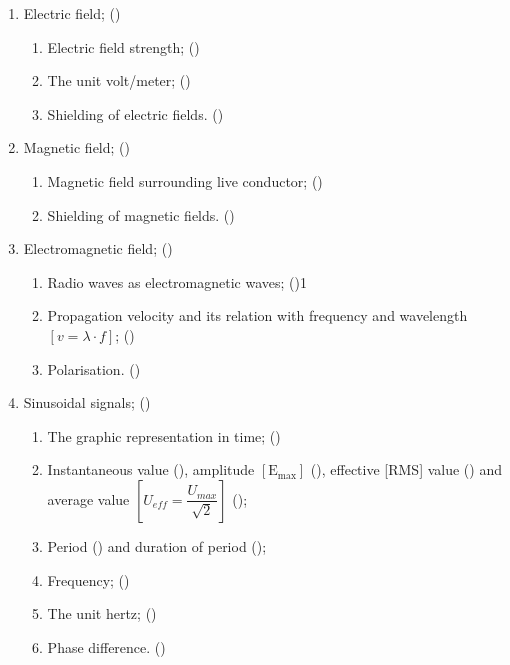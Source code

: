 \begin{flushleft}
\begin{enumerate}
\begin{enumerate}
\item Electric field; ()\label{HAREC.a.1.3}
\begin{enumerate}
\item Electric field strength; ()\label{HAREC.a.1.3.1}
\item The unit volt/meter; ()\label{HAREC.a.1.3.2}
\item Shielding of electric fields. ()\label{HAREC.a.1.3.3}
\end{enumerate}

\item Magnetic field; ()\label{HAREC.a.1.4}
\begin{enumerate}
\item Magnetic field surrounding live conductor; ()\label{HAREC.a.1.4.1}
\item Shielding of magnetic fields. ()\label{HAREC.a.1.4.2}
\end{enumerate}

\item Electromagnetic field; ()\label{HAREC.a.1.5}
\begin{enumerate}
\item Radio waves as electromagnetic waves; ()\label{HAREC.a.1.5.1}1
\item Propagation velocity and its relation with frequency and wavelength
  \(\left[v = \lambda \cdot f\right]\);
  ()\label{HAREC.a.1.5.2}
\item Polarisation. ()\label{HAREC.a.1.5.3}
\end{enumerate}

\item Sinusoidal signals; ()\label{HAREC.a.1.6}
\begin{enumerate}
\item The graphic representation in time;
  ()\label{HAREC.a.1.6.1}
\item Instantaneous value ()\label{HAREC.a.1.6.2a},
  amplitude \(\mathrm{[E_{max}]}\)
  ()\label{HAREC.a.1.6.2b},
  effective [RMS] value ()\label{HAREC.a.1.6.2c}
  and average value \(\left[U_{eff} = \dfrac{U_{max}}{\sqrt{2}}\right]\)
  ()\label{HAREC.a.1.6.2d};
\item Period ()\label{HAREC.a.1.6.3a}
  and duration of period ()\label{HAREC.a.1.6.3b};
\item Frequency; ()\label{HAREC.a.1.6.4}
\item The unit hertz; ()\label{HAREC.a.1.6.5}
\item Phase difference. ()\label{HAREC.a.1.6.6}
\end{enumerate}


\end{enumerate}
\end{enumerate}
\end{flushleft}
